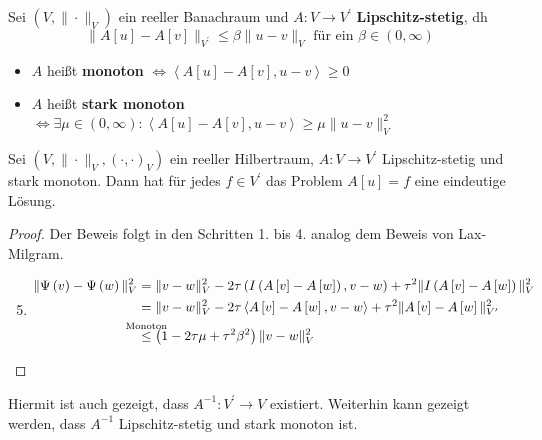 \begin{definition}
	Sei $\left(V,\|\cdot\|_{V}\right)$ ein reeller Banachraum und $A\colon V\to V^{\prime}$ \textbf{Lipschitz-stetig}, dh
	\begin{equation*}
		\|A\left[u\right]-A\left[v\right]\|_{V^{\prime}}\leq\beta\|u-v\|_{V}\text{ für ein }\beta\in\left(0,\infty\right)
	\end{equation*}
	\begin{itemize}
		\item $A$ heißt \textbf{monoton} $\Leftrightarrow \left<A\left[u\right]-A\left[v\right],u-v\right> \geq 0$
		\item $A$ heißt \textbf{stark monoton} $\Leftrightarrow \exists\mu\in\left(0,\infty\right)\colon\left< A\left[u\right]-A\left[v\right],u-v\right> \geq \mu\|u-v\|_{V}^{2}$
	\end{itemize}
\end{definition}

\begin{lemma}
	Sei $\left(V,\|\cdot\|_{V},\left(\cdot,\cdot\right)_{V}\right)$ ein reeller Hilbertraum, $A\colon V\to V^{\prime}$ Lipschitz-stetig und stark monoton.
	Dann hat für jedes $f\in V^{\prime}$ das Problem $A\left[u\right] = f$ eine eindeutige Lösung.
\end{lemma}
\begin{proof}
	Der Beweis folgt in den Schritten 1. bis 4. analog dem Beweis von Lax-Milgram.
	\begin{enumerate}
		\setcounter{enumi}{4}
		\item \begin{align*}
			\|\Psi\left(v\right)-\Psi\left(w\right)\|_{V}^{2} &= \|v-w\|_{V}^{2}-2\tau\left(I\left(A\left[v\right]-A\left[w\right]\right),v-w\right) + \tau^{2}\|I\left(A\left[v\right]-A\left[w\right]\right)\|_{V}^{2}\\
			&= \|v-w\|_{V}^{2} - 2\tau\left<A\left[v\right]-A\left[w\right],v-w\right> + \tau^{2}\|A\left[v\right]-A\left[w\right]\|_{V^{\prime}}^{2}\\
			&\overset{\mathclap{\text{Monoton}}}{\leq}\left(1-2\tau\mu+\tau^{2}\beta^{2}\right)\|v-w\|_{V}^{2}
			\end{align*}
	\end{enumerate}
\end{proof}
Hiermit ist auch gezeigt, dass $A^{-1}\colon V^{\prime}\to V$ existiert. Weiterhin kann gezeigt werden, dass $A^{-1}$ Lipschitz-stetig und stark monoton ist.

